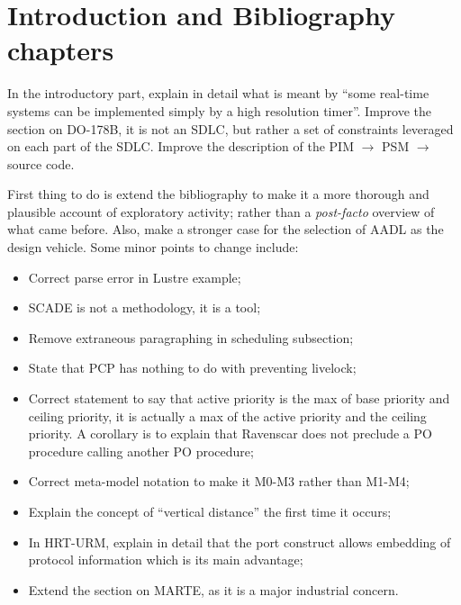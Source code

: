 \documentclass{article}
\begin{document}
\section{Introduction and Bibliography chapters}
In the introductory part, explain in detail what is meant by ``some
real-time systems can be implemented simply by a high resolution
timer''. Improve the section on DO-178B, it is not an SDLC, but rather
a set of constraints leveraged on each part of the SDLC. Improve the
description of the PIM $\to$ PSM $\to$ source code.

First thing to do is extend the bibliography to make it a more
thorough and plausible account of exploratory activity; rather than a
\emph{post-facto} overview of what came before. Also, make a stronger
case for the selection of AADL as the design vehicle. Some minor
points to change include:

\begin{itemize}
\item{Correct parse error in Lustre example;}
\item{SCADE is not a methodology, it is a tool;}
\item{Remove extraneous paragraphing in scheduling subsection;}
\item{State that PCP has nothing to do with preventing livelock;}
\item{Correct statement to say that active priority is the max of base
  priority and ceiling priority, it is actually a max of the active
  priority and the ceiling priority. A corollary is to explain that
  Ravenscar does not preclude a PO procedure calling another PO
  procedure;}
\item{Correct meta-model notation to make it M0-M3 rather than M1-M4;}
\item{Explain the concept of ``vertical distance'' the first time it
  occurs;}
\item{In HRT-URM, explain in detail that the port construct allows
  embedding of protocol information which is its main advantage;}
\item{Extend the section on MARTE, as it is a major industrial
  concern.}
\end{itemize}
\end{document}
